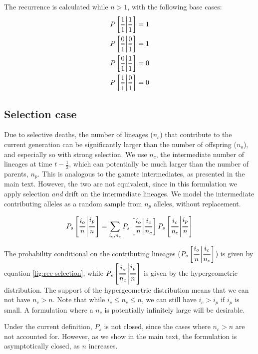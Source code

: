 \documentclass[review]{elsarticle}
\newcommand{\Dfrac}[2]{%
  \ooalign{%
    $\genfrac{}{}{1.2pt}0{#1}{#2}$\cr%
    $\color{white}\genfrac{}{}{.4pt}0{\phantom{#1}}{\phantom{#2}}$}%
}
\newcommand{\cond}{\middle\vert}
\begin{document}
The recurrence is calculated while $n>1$, with the following base cases:
\begin{align*}
  P\left[ \Dfrac{1}{1} \cond \Dfrac{1}{1} \right] &= 1 \\
  P\left[ \Dfrac{0}{1} \cond \Dfrac{0}{1} \right] &= 1 \\
  P\left[ \Dfrac{0}{1} \cond \Dfrac{1}{1} \right] &= 0 \\
  P\left[ \Dfrac{1}{1} \cond \Dfrac{0}{1} \right] &= 0 \\
\end{align*}

\subsection{Selection case}

Due to selective deaths, the number of lineages ($n_c$) that contribute to the current generation
can be significantly larger than the number of offspring ($n_o$), and especially so with strong
selection. We use $n_c$, the intermediate number of lineages at time $t-\frac{1}{2}$, which can
potentially be much larger than the number of parents, $n_p$. This is analogous to the gamete
intermediates, as presented in the main text. However, the two are not equivalent, since in this
formulation we apply selection \emph{and} drift on the intermediate lineages. We model the
intermediate contributing alleles as a random sample from $n_p$ alleles, without replacement.

\begin{equation}
  P_s\left[ \Dfrac{i_o}{n} \cond \Dfrac{i_p}{n} \right] = \sum_{i_c,n_c}P_s\left[ \Dfrac{i_o}{n}
    \cond \Dfrac{i_c}{n_c} \right] P_s\left[ \Dfrac{i_c}{n_c} \cond \Dfrac{i_p}{n} \right]
\end{equation}

The probability conditional on the contributing lineages
($P_s\left[ \Dfrac{i_o}{n} \cond \Dfrac{i_c}{n_c} \right]$) is given by equation
\ref{fig:rec-selection}, while $P_s\left[ \Dfrac{i_c}{n_c} \cond \Dfrac{i_p}{n} \right]$ is given by
the hypergeometric distribution. The support of the hypergeometric distribution means that we can
not have $n_c>n$. Note that while $i_c \le n_c \le n$, we can still have $i_c>i_p$ if $i_p$ is
small. A formulation where a $n_c$ is potentially infinitely large will be desirable.

Under the current definition, $P_s$ is not closed, since the cases where $n_c>n$ are not accounted
for. However, as we show in the main text, the formulation is asymptotically closed, as $n$ increases.
\end{document}
